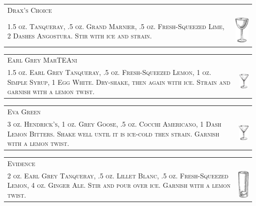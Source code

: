 \documentclass{article}
\begin{document}
\begin{tabular}{b{2.5in} m{0.625in}}
  \multicolumn{2}{p{3.0in}}{\centering\Huge\textsc{Drax's Choice}} \\ 
  \textsc{1.5 oz. Tanqueray, .5 oz. Grand Marnier, .5 oz. Fresh-Squeezed Lime,
  2 Dashes Angostura. Stir with ice and strain.} &
  \includegraphics[width=0.5in]{nick_and_nora.png}
\end{tabular}

\begin{tabular}{b{2.5in} m{0.625in}}
  \multicolumn{2}{p{3.0in}}{\centering\Huge\textsc{Earl Grey MarTEAni}} \\ 
  \textsc{1.5 oz. Earl Grey Tanqueray, .5 oz. Fresh-Squeezed Lemon, 
  1 oz. Simple Syrup, 1 Egg White. Dry-shake, then again with ice.
  Strain and garnish with a lemon twist.} &
  \includegraphics[width=0.5in]{goblet.png}
\end{tabular}

\begin{tabular}{b{2.5in} m{0.625in}}
  \multicolumn{2}{p{3.0in}}{\centering\Huge\textsc{Eva Green}} \\ 
  \textsc{3 oz. Hendrick's, 1 oz. Grey Goose, .5 oz. Cocchi Americano, 
  1 Dash Lemon Bitters. Shake well until it is ice-cold then strain.
  Garnish with a lemon twist.} &
  \includegraphics[width=0.5in]{goblet.png}
\end{tabular}

\begin{tabular}{b{2.5in} m{0.625in}}
  \multicolumn{2}{p{3.0in}}{\centering\Huge\textsc{Evidence}} \\ 
  \textsc{2 oz. Earl Grey Tanqueray, .5 oz. Lillet Blanc, .5 oz. 
  Fresh-Squeezed Lemon, 4 oz. Ginger Ale. Stir and pour over ice.
  Garnish with a lemon twist.} &
  \includegraphics[width=0.5in]{collins.png}
\end{tabular}
\end{document}
